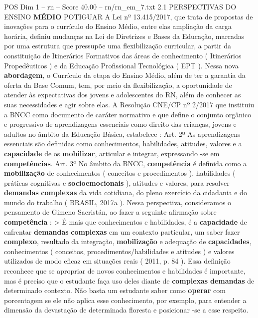 \begin{textsample}{POS Dim 1 – rn – Score 40.00 – rn/rn\_em\_7.txt}  \label{ex:f1_pos_268}
2.1 PERSPECTIVAS DO ENSINO \textbf{MÉDIO} POTIGUAR A Lei nº 13.415/2017, que trata de propostas de inovações para o currículo do Ensino Médio, entre elas ampliação da carga horária, definiu mudanças na Lei de Diretrizes e Bases da Educação, marcadas por uma estrutura que pressupõe uma flexibilização curricular, a partir da constituição de Itinerários Formativos das áreas de conhecimento ( Itinerários Propedêuticos ) e da Educação Profissional Tecnológica ( EPT ).
Nessa nova \textbf{abordagem}, o Currículo da etapa do Ensino Médio, além de ter a garantia da oferta da Base Comum, tem, por meio da flexibilização, a oportunidade de atender às expectativas dos jovens e adolescentes do RN, além de conhecer as suas necessidades e agir sobre elas.
A Resolução CNE/CP nº 2/2017 que instituiu a BNCC como documento de caráter normativo e que define o conjunto orgânico e progressivo de aprendizagens essenciais como direito das crianças, jovens e adultos no âmbito da Educação Básica, estabelece : Art. 2º As aprendizagens essenciais são definidas como conhecimentos, habilidades, atitudes, valores e a \textbf{capacidade} de os \textbf{mobilizar}, articular e integrar, expressando -se em \textbf{competências}.
Art. 3º No âmbito da BNCC, \textbf{competência} é definida como a \textbf{mobilização} de conhecimentos ( conceitos e procedimentos ), habilidades ( práticas cognitivas e \textbf{socioemocionais} ), atitudes e valores, para resolver \textbf{demandas} \textbf{complexas} da vida cotidiana, do pleno exercício da cidadania e do mundo do trabalho ( BRASIL, 2017a ).
Nessa perspectiva, consideramos o pensamento de Gimeno Sacristán, ao fazer a seguinte afirmação sobre \textbf{competência} : > É mais que conhecimentos e habilidades, é a \textbf{capacidade} de enfrentar \textbf{demandas} \textbf{complexas} em um contexto particular, um saber fazer \textbf{complexo}, resultado da integração, \textbf{mobilização} e adequação de \textbf{capacidades}, conhecimentos ( conceitos, procedimentos/habilidades e atitudes ) e valores utilizados de modo eficaz em situações reais ( 2011, p. 84 ).
Essa definição reconhece que se apropriar de novos conhecimentos e habilidades é importante, mas é preciso que o estudante faça uso deles diante de \textbf{complexas} \textbf{demandas} de determinado contexto.
Não basta um estudante saber como \textbf{operar} com porcentagem se ele não aplica esse conhecimento, por exemplo, para entender a dimensão da devastação de determinada floresta e posicionar -se a esse respeito.

\end{textsample}
